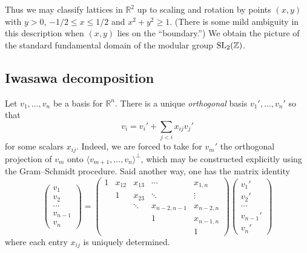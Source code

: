 \documentclass[reqno]{amsart} 
\begin{document}
Thus we may classify lattices in $\mathbb{R}^2$ up to scaling and rotation by points $(x,y)$ with $y > 0$, $-1/2 \leq x \leq 1/2$ and $x^2 + y^2 \geq 1$.  (There is some mild ambiguity in this description when $(x,y)$ lies on the ``boundary.'')  We obtain the picture of the standard fundamental domain of the modular group $\operatorname{SL}_2(\mathbb{Z})$.

\subsection{Iwasawa decomposition} \label{sec:org485b167}
Let $v_1,\dotsc, v_n$ be a basis for $\mathbb{R}^n$.  There is a unique \emph{orthogonal} basis $v_1', \dotsc, v_n'$ so that
\begin{equation*}
  v_i = v_i' + \sum_{j < i} x_{i j} v_j'
\end{equation*}
for some scalars $x_{i j}$.  Indeed, we are forced to take for $v_m'$ the orthogonal projection of $v_m$ onto $\langle v_{m+1},\dotsc, v_n \rangle^\perp$, which may be constructed explicitly using the Gram--Schmidt procedure.  Said another way, one has the matrix identity
\begin{equation*}
  \begin{pmatrix}
    v_1  \\
    v_2  \\
    \dotsb  \\
    v_{n-1} \\
    v_n
  \end{pmatrix}
  =
  \begin{pmatrix}
    1 & x_{12} & x_{1 3} & \dotsb & x_{1, n} \\
      & 1 & x_{23}  & \ddots & \vdots \\
      &  & \ddots & x_{n-2,n-1} & x_{n-2,n} \\
      &  &  & 1 & x_{n-1, n}\\
      & & & & 1
  \end{pmatrix}
  \begin{pmatrix}
    v_1'  \\
    v_2'  \\
    \dotsb  \\
    v_{n-1}'  \\
    v _n '
  \end{pmatrix}
\end{equation*}
where each entry $x_{i j}$ is uniquely determined.
\end{document}
